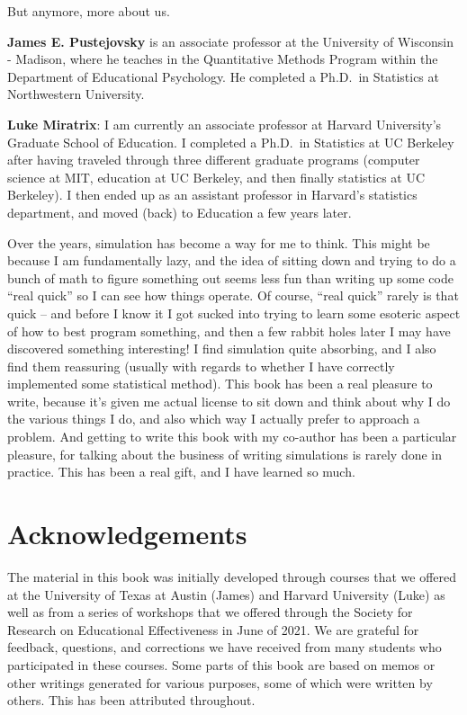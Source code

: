 \documentclass[
]{book}
\begin{document}
But anymore, more about us.

\textbf{James E. Pustejovsky} is an associate professor at the University of Wisconsin - Madison, where he teaches in the Quantitative Methods Program within the Department of Educational Psychology. He completed a Ph.D.~in Statistics at Northwestern University.

\textbf{Luke Miratrix}: I am currently an associate professor at Harvard University's Graduate School of Education. I completed a Ph.D.~in Statistics at UC Berkeley after having traveled through three different graduate programs (computer science at MIT, education at UC Berkeley, and then finally statistics at UC Berkeley).
I then ended up as an assistant professor in Harvard's statistics department, and moved (back) to Education a few years later.

Over the years, simulation has become a way for me to think.
This might be because I am fundamentally lazy, and the idea of sitting down and trying to do a bunch of math to figure something out seems less fun than writing up some code ``real quick'' so I can see how things operate. Of course, ``real quick'' rarely is that quick -- and before I know it I got sucked into trying to learn some esoteric aspect of how to best program something, and then a few rabbit holes later I may have discovered something interesting! I find simulation quite absorbing, and I also find them reassuring (usually with regards to whether I have correctly implemented some statistical method). This book has been a real pleasure to write, because it's given me actual license to sit down and think about why I do the various things I do, and also which way I actually prefer to approach a problem. And getting to write this book with my co-author has been a particular pleasure, for talking about the business of writing simulations is rarely done in practice. This has been a real gift, and I have learned so much.

\section*{Acknowledgements}\label{acknowledgements}

The material in this book was initially developed through courses that we offered at the University of Texas at Austin (James) and Harvard University (Luke) as well as from a series of workshops that we offered through the Society for Research on Educational Effectiveness in June of 2021. We are grateful for feedback, questions, and corrections we have received from many students who participated in these courses. Some parts of this book are based on memos or other writings generated for various purposes, some of which were written by others.
This has been attributed throughout.
\end{document}
